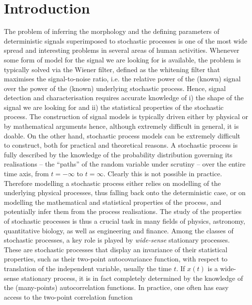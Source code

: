 \documentclass{aa}
\begin{document}
	\maketitle


\section{Introduction}

The problem of inferring the morphology and the defining parameters of deterministic signals superimposed to stochastic processes is one of the most wide spread and interesting problems in several areas of human activities. Whenever some form of model for the signal we are looking for is available, the problem is typically solved via the Wiener filter, defined as the whitening filter that maximises the signal-to-noise ratio, i.e. the relative power of the (known) signal over the power of the (known) underlying stochastic process. Hence, signal detection and characterisation requires accurate knowledge of i) the shape of the signal we are looking for and ii) the statistical properties of the stochastic process. The construction of signal models is typically driven either by physical or by mathematical arguments hence, although extremely difficult in general, it is doable. On the other hand, stochastic process models can be extremely difficult to construct, both for practical and theoretical reasons. A stochastic process is fully described by the knowledge of the probability distribution governing its realisations -- the ``paths'' of the random variable under scrutiny -- over the entire time axis, from $t=-\infty$ to $t=\infty$. Clearly this is not possible in practice. Therefore modelling a stochastic process either relies on modelling of the underlying physical processes, thus falling back onto the deterministic case, or on modelling the mathematical and statistical properties of the process, and potentially infer them from the process realisations. The study of the properties of stochastic processes is thus a crucial task in many fields of physics, astronomy, quantitative biology, as well as engineering and finance. Among the classes of stochastic processes, a key role is played by \textit{wide-sense} stationary processes. These are stochastic processes that display an invariance of their statistical properties, such as their two-point autocovariance function, with respect to translation of the independent variable, usually the time $t$. If $x(t)$ is a wide-sense stationary process, it is in fact completely determined by the knowledge of the (many-points) autocorrelation functions. In practice, one often has easy access to the two-point correlation function 
\end{document}
